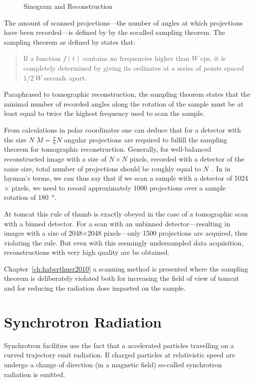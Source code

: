 \begin{figure}
{		\label{subfig:sin}%
		}%
	\caption{Sinogram and Reconstruction}
	\label{fig:Sin Rec}
\end{figure}

The amount of scanned projections---the number of angles at which projections have been recorded---is defined by by the socalled sampling theorem. The sampling theorem as defined by \citet{Shannon1949} states that: \begin{quote} If a function $f(t)$ contains no frequencies higher than $W$ cps, it is completely determined by giving its ordinates at a series of points spaced $1/2\ W$ seconds apart. \cite{Shannon1949}\end{quote}

Paraphrased to tomographic reconstruction, the sampling theorem states that the minimal number of recorded angles along the rotation of the sample must be at least equal to twice the highest frequency used to scan the sample.

From calculations in polar coordinates one can deduce that for a detector with the size $N$ $M=\frac{\pi}{n}N$ angular projections are required to fulfill the sampling theorem for tomographic reconstruction. Generally, for well-balanced reconstructed image with a size of $N\times N$ pixels, recorded with a detector of the same size, total number of projections should be roughly equal to $N$~\cite{Kak2002}. In in layman's terms, we can thus say that if we scan a sample with a detector of 1024$\times$ pixels, we need to record approximately 1000 projections over a sample rotation of \SI{180}{\degree}.

At \ac{tomcat} this rule of thumb is exactly obeyed in the case of a tomographic scan with a binned detector. For a scan with an unbinned detector---resulting in images with a size of 2048$\times$2048 pixels---only 1500 projections are acquired, thus violating the rule. But even with this seemingly undersampled data acquisition, reconstructions with very high quality are be obtained.

Chapter~\ref{ch:haberthuer2010} a scanning method is presented where the sampling theorem is deliberately violated both for increasing the field of view of \ac{tomcat} and for reducing the radiation dose imparted on the sample.

\section{Synchrotron Radiation}
Synchrotron facilities use the fact that a accelerated particles travelling on a curved trajectory emit radiation. If charged particles at relativistic speed are undergo a change of direction (\ie in a magnetic field) so-called synchrotron radiation is emitted. 

